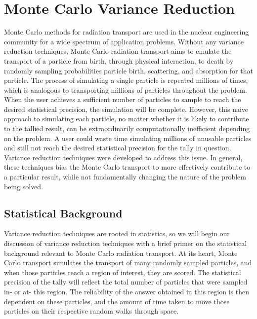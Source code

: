 \section{Monte Carlo Variance Reduction}
\label{sec:MCvar}

Monte Carlo methods for radiation transport are used in the nuclear
engineering community for a wide spectrum of application problems. Without any
variance reduction techniques, Monte Carlo radiation transport aims to emulate
the transport of a particle from birth, through physical interaction, to death
by randomly sampling probabilities particle birth, scattering, and absorption
for that particle.
The process of simulating a single particle
is repeated millions of times, which is analogous to transporting
millions of particles throughout the problem. When the user achieves a
sufficient
number of particles to sample to reach the desired statistical precision, the
simulation will be complete. However, this naive approach to simulating each
particle, no matter whether it is likely to contribute to the tallied result,
can be extraordinarily computationally inefficient depending on the problem. A
user could waste time simulating millions of unusable particles and still not
reach the desired statistical precision for the tally in question. Variance
reduction techniques were developed to address this issue. In general, these
techniques bias the Monte Carlo transport to more effectively
contribute to a particular result, while not fundamentally changing the nature
of the problem being solved.

\subsection{Statistical Background}
\label{subsec:StatBkgnd}

Variance reduction techniques are rooted in statistics, so we will begin our
discussion of variance reduction techniques with a brief primer on the
statistical background relevant to Monte Carlo radiation transport. At its
heart, Monte Carlo transport simulates the transport of many randomly sampled
particles, and when those particles reach a region of interest, they are scored.
The statistical precision of the tally
will reflect the total number of particles that were sampled in- or at- this
region. The reliability of the answer obtained in this region is then dependent
on these particles, and the amount of time taken to move those particles on
their respective random walks through space.

